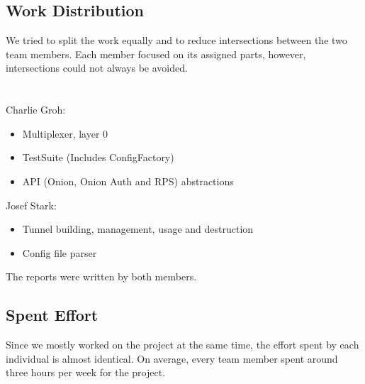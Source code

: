 \documentclass{article}
\begin{document}
\subsection{Work Distribution}
We tried to split the work equally and to reduce intersections between the two team members. Each member focused on its assigned parts, however, intersections could not always be avoided. \\
\\
\\
Charlie Groh:
\begin{itemize}
	\item Multiplexer, layer 0
	\item TestSuite (Includes ConfigFactory)
	\item API (Onion, Onion Auth and RPS) abstractions
\end{itemize}
\hbox{}
Josef Stark:
\begin{itemize}
	\item Tunnel building, management, usage and destruction
	\item Config file parser
\end{itemize}
\hbox{} 
The reports were written by both members.


\subsection{Spent Effort}
Since we mostly worked on the project at the same time, the effort spent by each individual is
almost identical. On average, every team member spent around three hours per week for the project.
\end{document}
